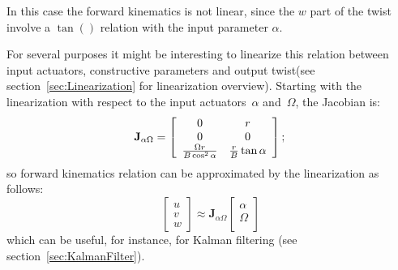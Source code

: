 In this case the forward kinematics is not linear, since the $w$ part of the twist involve a $\tan()$ relation with the input parameter $\alpha$. 

For several purposes it might be interesting to linearize this relation between input actuators, constructive parameters and output twist(see section~\ref{sec:Linearization} for linearization overview). Starting with the linearization with respect to the input actuators~$\alpha$ and~$\Omega$, the Jacobian is: 
\begin{equation}
\mathbf{J}_{\alpha \Omega} = 
\left[
 \begin{array}{cc}
  0 & r  \\
  0 & 0  \\
  \frac{\Omega r}{B \cos ^2 \alpha} & \frac{r}{B}\tan \alpha
 \end{array}
 \right]; \\ 
\end{equation}
 so forward kinematics relation can be approximated by the linearization as follows: 
\begin{equation}
 \left[
 \begin{array}{c}
  u \\
  v  \\
  w 
 \end{array}
 \right] \approx \mathbf{J}_{\alpha \Omega}
 \left[
 \begin{array}{c}
  \alpha \\
  \Omega \\
 \end{array} 
 \right]
\end{equation}
which can be useful, for instance, for Kalman filtering (see section~\ref{sec:KalmanFilter}).

